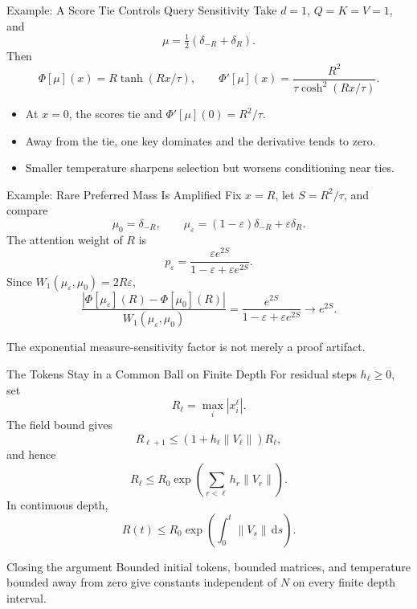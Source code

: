 \documentclass[aspectratio=169,11pt]{beamer}
\newcommand{\dd}{\,\mathrm{d}}
\newcommand{\abs}[1]{\left\lvert#1\right\rvert}
\newcommand{\norm}[1]{\left\lVert#1\right\rVert}
\begin{document}
\begin{frame}{Example: A Score Tie Controls Query Sensitivity}
Take $d=1$, $Q=K=V=1$, and
\[
 \mu=\tfrac12(\delta_{-R}+\delta_R).
\]
Then
\[
 \Phi[\mu](x)=R\tanh(Rx/\tau),
 \qquad
 \Phi'[\mu](x)=\frac{R^2}{\tau\cosh^2(Rx/\tau)}.
\]

\begin{itemize}
\item At $x=0$, the scores tie and $\Phi'[\mu](0)=R^2/\tau$.
\item Away from the tie, one key dominates and the derivative tends to zero.
\item Smaller temperature sharpens selection but worsens conditioning near ties.
\end{itemize}
\end{frame}

\begin{frame}{Example: Rare Preferred Mass Is Amplified}
Fix $x=R$, let $S=R^2/\tau$, and compare
\[
 \mu_0=\delta_{-R},
 \qquad
 \mu_\varepsilon=(1-\varepsilon)\delta_{-R}+\varepsilon\delta_R.
\]
The attention weight of $R$ is
\[
 p_\varepsilon
 =\frac{\varepsilon e^{2S}}
        {1-\varepsilon+\varepsilon e^{2S}}.
\]
Since $W_1(\mu_\varepsilon,\mu_0)=2R\varepsilon$,
\[
 \frac{\abs{\Phi[\mu_\varepsilon](R)-\Phi[\mu_0](R)}}
      {W_1(\mu_\varepsilon,\mu_0)}
 =\frac{e^{2S}}{1-\varepsilon+\varepsilon e^{2S}}
 \longrightarrow e^{2S}.
\]

The exponential measure-sensitivity factor is not merely a proof artifact.
\end{frame}

\begin{frame}{The Tokens Stay in a Common Ball on Finite Depth}
\small
For residual steps $h_\ell\ge0$, set
\[
 R_\ell=\max_i\abs{x_i^\ell}.
\]
The field bound gives
\[
 R_{\ell+1}
 \le (1+h_\ell\norm{V_\ell})R_\ell,
\]
and hence
\[
 R_\ell\le R_0
 \exp\!\left(\sum_{r<\ell}h_r\norm{V_r}\right).
\]
In continuous depth,
\[
 R(t)\le R_0\exp\!\left(\int_0^t\norm{V_s}\dd s\right).
\]

\begin{block}{Closing the argument}
Bounded initial tokens, bounded matrices, and temperature bounded away from zero give constants independent of $N$ on every finite depth interval.
\end{block}
\end{frame}
\end{document}
